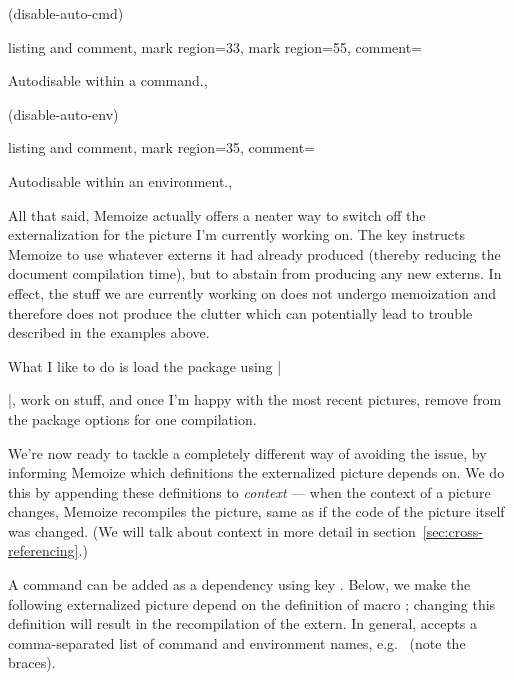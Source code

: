 \documentclass[a4paper,11pt]{article}
\begin{document}
\begin{tcbraster}[raster columns=2, raster equal height=rows]
  \tcbinputexample(disable-auto-cmd){
    listing and comment,
    mark region={3}{3}, mark region={5}{5},
    comment=\raggedright Autodisable within a command.,
  }
  \tcbinputexample(disable-auto-env){
    listing and comment,
    mark region={3}{5},
    comment=\raggedright Autodisable within an environment.,
  }
\end{tcbraster}

All that said, Memoize actually offers a neater way to switch off the
externalization for the picture I'm currently working on.  The
 key instructs Memoize to use whatever externs it had
already produced (thereby reducing the document compilation time), but to
abstain from producing any new externs.  In effect, the stuff we are currently
working on does not undergo memoization and therefore does not produce the
clutter which can potentially lead to trouble described in the 
examples above.

What I like to do is load the package using |\usepackage[readonly]{memoize}|,
work on stuff, and once I'm happy with the most recent pictures, remove
 from the package options for one compilation.


\begin{tcbraster}[raster columns=5, raster valign=top, raster column skip=4mm]
\end{tcbraster}

We're now ready to tackle a completely different way of avoiding the issue, by
informing Memoize which definitions the externalized picture depends on.  We do
this by appending these definitions to \emph{context} --- when the context of a
picture changes, Memoize recompiles the picture, same as if the code of the
picture itself was changed.  (We will talk about context in more detail in
section~\ref{sec:cross-referencing}.)

A command can be added as a dependency using key .  Below, we make the following externalized picture depend on the
definition of macro ; changing this definition will result in the
recompilation of the extern.  In general,  accepts a
comma-separated list of command and environment names, e.g.\
 (note the braces).
\end{document}
